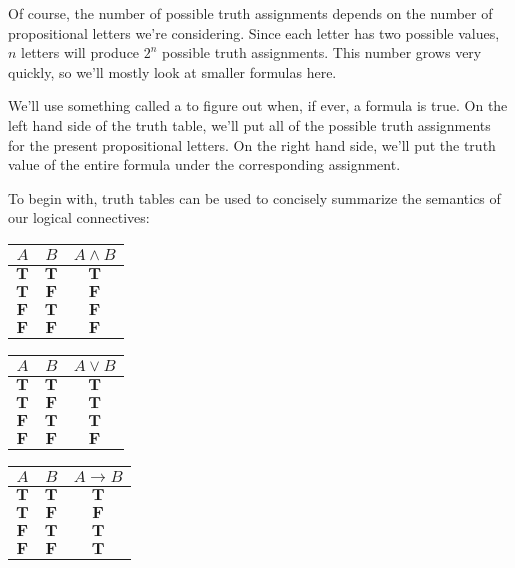 \documentclass[letterpaper,10pt,english]{sphinxmanual}
\begin{document}
\sphinxAtStartPar
Of course, the number of possible truth assignments depends on the number of propositional letters we’re considering. Since each letter has two possible values, \(n\) letters will produce \(2^n\) possible truth assignments. This number grows very quickly, so we’ll mostly look at smaller formulas here.

\sphinxAtStartPar
We’ll use something called a  to figure out when, if ever, a formula is true. On the left hand side of the truth table, we’ll put all of the possible truth assignments for the present propositional letters. On the right hand side, we’ll put the truth value of the entire formula under the corresponding assignment.

\sphinxAtStartPar
To begin with, truth tables can be used to concisely summarize the semantics of our logical connectives:



\begin{center}
\begin{tabular} {|c|c||c|}
\hline
$A$      & $B$      & $A \wedge B$ \\ \hline
$\mathbf{T}$  & $\mathbf{T}$  & $\mathbf{T}$      \\ \hline
$\mathbf{T}$  & $\mathbf{F}$ & $\mathbf{F}$     \\ \hline
$\mathbf{F}$ & $\mathbf{T}$  & $\mathbf{F}$     \\ \hline
$\mathbf{F}$ & $\mathbf{F}$ & $\mathbf{F}$     \\ \hline
\end{tabular}
\quad
\begin{tabular} {|c|c||c|}
\hline
$A$      & $B$      & $A \vee B$ \\ \hline
$\mathbf{T}$  & $\mathbf{T}$  & $\mathbf{T}$      \\ \hline
$\mathbf{T}$  & $\mathbf{F}$ & $\mathbf{T}$      \\ \hline
$\mathbf{F}$ & $\mathbf{T}$  & $\mathbf{T}$      \\ \hline
$\mathbf{F}$ & $\mathbf{F}$ & $\mathbf{F}$     \\ \hline
\end{tabular}
\quad
\begin{tabular} {|c|c||c|}
\hline
$A$      & $B$      & $A \to B$ \\ \hline
$\mathbf{T}$  & $\mathbf{T}$  & $\mathbf{T}$      \\ \hline
$\mathbf{T}$  & $\mathbf{F}$ & $\mathbf{F}$     \\ \hline
$\mathbf{F}$ & $\mathbf{T}$  & $\mathbf{T}$      \\ \hline
$\mathbf{F}$ & $\mathbf{F}$ & $\mathbf{T}$      \\ \hline
\end{tabular}
\end{center}
\end{document}

